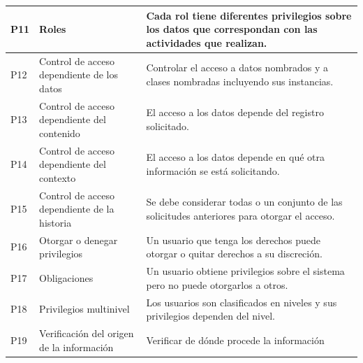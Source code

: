 \begin{table}[!ht]
\begin{center}
\begin{tabular}{|m{0.5cm} |m{3.5cm}|m{10cm}|}
	P11 & Roles & Cada rol tiene diferentes privilegios sobre los datos que correspondan con las actividades que realizan. \\ \hline
	P12 & Control de acceso dependiente de los datos & Controlar el acceso a datos nombrados y a clases nombradas incluyendo sus instancias. \\ \hline
	P13 & Control de acceso dependiente del contenido & El acceso a los datos depende del registro solicitado.\\ \hline
	P14 & Control de acceso dependiente del contexto & El acceso a los datos depende en qué otra información se está solicitando. \\ \hline
	P15 & Control de acceso dependiente de la historia & Se debe considerar todas o un conjunto de las solicitudes anteriores para otorgar el acceso.  \\ \hline
	P16 & Otorgar o denegar privilegios & Un usuario que tenga los derechos puede otorgar o quitar derechos a su discreción. \\ \hline
	P17 & Obligaciones& Un usuario obtiene privilegios sobre el sistema pero no puede otorgarlos a otros. \\ \hline
	P18 & Privilegios multinivel & Los usuarios son clasificados en niveles y sus privilegios dependen del nivel.  \\ \hline
	P19 & Verificación del origen de la información & Verificar de dónde procede la información\\ \hline
\end{tabular}
\label{poliSeg}
\end{center}
\end{table}

\normalsize


